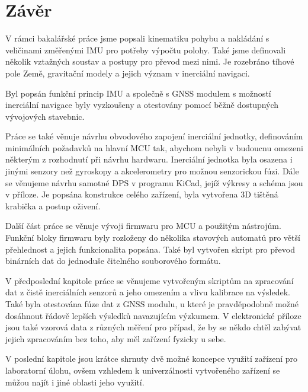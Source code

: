 \chapter*{Závěr}
{}
V rámci bakalářské práce jsme popsali kinematiku pohybu a nakládání s veličinami změřenými IMU pro potřeby výpočtu polohy. Také jsme definovali několik vztažných soustav a postupy pro převod mezi nimi. Je rozebráno tíhové pole Země, gravitační modely a jejich význam v inerciální navigaci.

Byl popsán funkční princip IMU a společně s GNSS modulem s možností inerciální navigace byly vyzkoušeny a otestovány pomocí běžně dostupných vývojových stavebnic.

Práce se také věnuje návrhu obvodového zapojení inerciální jednotky, definováním minimálních požadavků na hlavní MCU tak, abychom nebyli v budoucnu omezeni některým z rozhodnutí při návrhu hardwaru. Inerciální jednotka byla osazena i jinými senzory než gyroskopy a akcelerometry pro možnou senzorickou fúzi. Dále se věnujeme návrhu samotné DPS v programu KiCad, jejíž výkresy a schéma jsou v příloze. Je popsána konstrukce celého zařízení, byla vytvořena 3D tištěná krabička a postup oživení.

Další část práce se věnuje vývoji firmwaru pro MCU a použitým nástrojům. Funkční bloky firmwaru byly rozloženy do několika stavových automatů pro větší přehlednost a jejich funkcionalita popsána. Také byl vytvořen skript pro převod binárních dat do jednoduše čitelného souborového formátu.

V předposlední kapitole práce se věnujeme vytvořeným skriptům na zpracování dat z čistě inerciálních senzorů a jeho omezením a vlivu kalibrace na výsledek. Také byla otestována fúze dat z GNSS modulu, u které je pravděpodobně možné dosáhnout řádově lepších výsledků navazujícím výzkumem. V elektronické příloze jsou také vzorová data z různých měření pro případ, že by se někdo chtěl zabývat jejich zpracováním bez toho, aby měl zařízení fyzicky u sebe.

V poslední kapitole jsou krátce shrnuty dvě možné koncepce využití zařízení pro laboratorní úlohu, ovšem vzhledem k univerzálnosti vytvořeného zařízení se můžou najít i jiné oblasti jeho využití.

